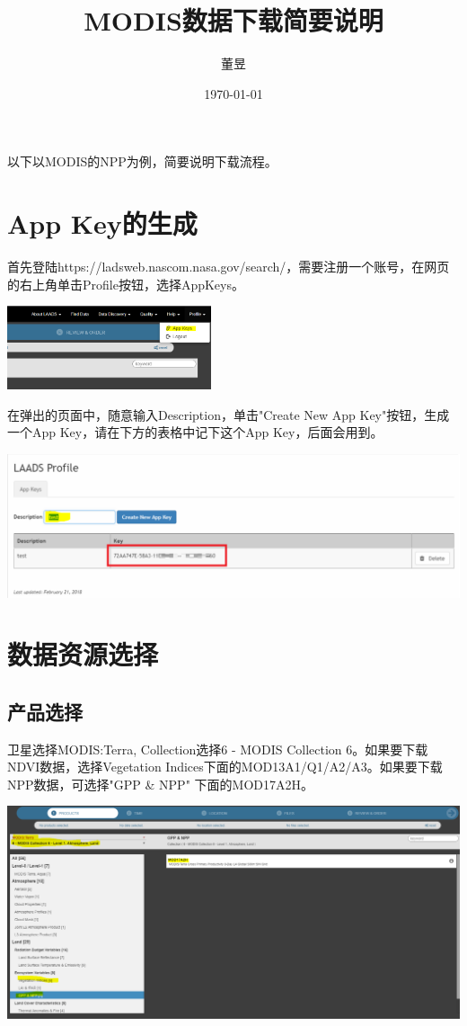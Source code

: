 \documentclass{article}
\title{MODIS数据下载简要说明}
\author{董昱}
\date{\today}
\begin{document}
	\maketitle
	以下以MODIS的NPP为例，简要说明下载流程。
	\section{App Key的生成}
	首先登陆https://ladsweb.nascom.nasa.gov/search/，需要注册一个账号，在网页的右上角单击Profile按钮，选择AppKeys。
	
	\includegraphics[width=6cm]{sec1_1.PNG}
	
	在弹出的页面中，随意输入Description，单击"Create New App Key"按钮，生成一个App Key，请在下方的表格中记下这个App Key，后面会用到。
	
	\includegraphics[width=\linewidth]{sec1_2.png}
	
	\section{数据资源选择}
	
	\subsection{产品选择}
	
	卫星选择MODIS:Terra, Collection选择6 - MODIS Collection 6。如果要下载NDVI数据，选择Vegetation Indices下面的MOD13A1/Q1/A2/A3。如果要下载NPP数据，可选择"GPP \& NPP" 下面的MOD17A2H。
	
	\includegraphics[width=\linewidth]{sec2_1.png}
	
\end{document}
